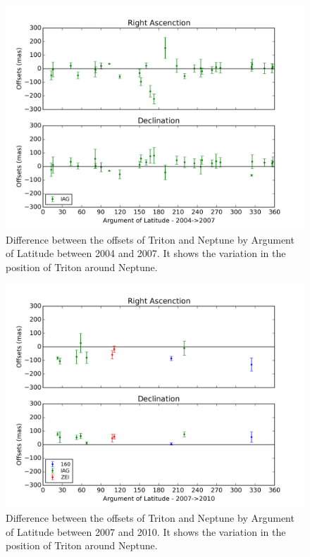 \documentclass[12pt,a4paper]{report}
\begin{document}
\begin{figure}[H]
\includegraphics[width=16.0cm]{Anom_TN_2004-2007.png} 
\caption{Difference between the offsets of Triton and Neptune by Argument of Latitude between 2004 and 2007. It shows the variation in the position of Triton around Neptune.}
\label{Fig:triton-netuno-anom}
\end{figure}

\begin{figure}[H]
\includegraphics[width=16.0cm]{Anom_TN_2007-2010.png} 
\caption{Difference between the offsets of Triton and Neptune by Argument of Latitude between 2007 and 2010. It shows the variation in the position of Triton around Neptune.}
\label{Fig:triton-netuno-anom}
\end{figure}
\end{document}
